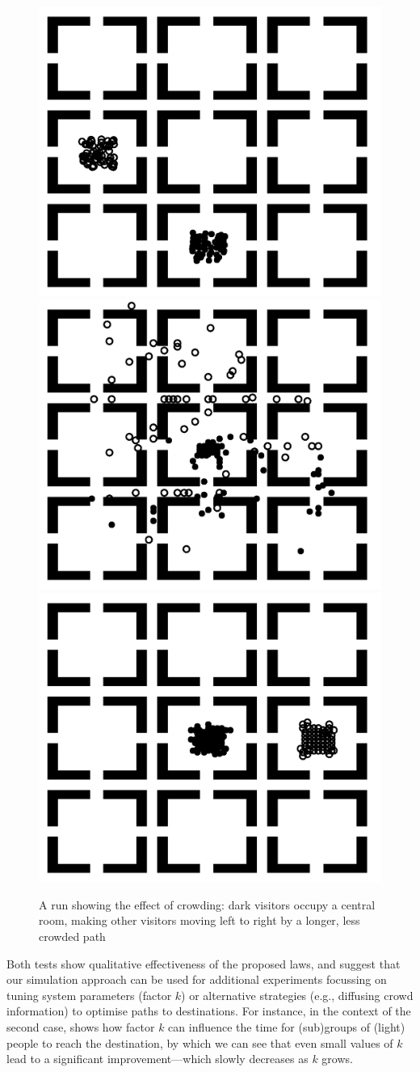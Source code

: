 \documentclass[12pt,a4paper,twoside,openright]{book}
\begin{document}
\begin{figure}
\begin{center}
    \includegraphics[width=0.3\columnwidth]{img/jos-snapshots/2-1}
    \includegraphics[width=0.3\columnwidth]{img/jos-snapshots/2-3}
    \includegraphics[width=0.3\columnwidth]{img/jos-snapshots/2-4}
    \caption{A run showing the effect of crowding: dark visitors occupy a central room, making other visitors moving left to right by a longer, less crowded path \label{img:museum-generalmap2}}    
\end{center}
\end{figure}

Both tests show qualitative effectiveness of the proposed laws, and suggest that our simulation approach can be used for additional experiments focussing on tuning system parameters (factor $k$) or alternative strategies (e.g., diffusing crowd information) to optimise paths to destinations.
%
For instance, in the context of the second case,  shows how factor $k$ can influence the time for (sub)groups of (light) people to reach the destination, by which we can see that even small values of $k$ lead to a significant improvement---which slowly decreases as $k$ grows.
\end{document}
